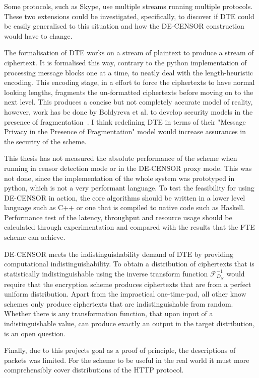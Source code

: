 \documentclass[ %
                    author={Samuel Russell},
                supervisor={Prof. Bogdan Warinschi},
                    degree={MEng},
                     title={Innocuous Ciphertexts},
                  subtitle={The DE-CENSOR Scheme},
                      type={research},
                      year={2018} ]{dissertation}
\begin{document}
Some protocols, such as Skype, use multiple streams running multiple protocols. These two extensions could be investigated, specifically, to discover if DTE could be easily generalised to this situation and how the DE-CENSOR construction would have to change. 

The formalisation of DTE works on a stream of plaintext to produce a stream of ciphertext.
It is formalised this way, contrary to the python implementation of processing message blocks one at a time, to neatly deal with the length-heuristic encoding.
This encoding stage, in a effort to force the ciphertexts to have normal looking lengths, fragments the un-formatted ciphertexts before moving on to the next level.
This produces a concise but not completely accurate model of reality, however, work has be done by Boldyreva et al. to develop security models in the presence of fragmentation~\cite{frag}.
I think redefining DTE in terms of their "Message Privacy in the Presence of Fragmentation" model would increase assurances in the security of the scheme.

This thesis has not measured the absolute performance of the scheme when running in censor detection mode or in the DE-CENSOR proxy mode. This was not done, since the implementation of the whole system was prototyped in python, which is not a very performant language. To test the feasibility for using DE-CENSOR in action, the core algorithms should be written in a lower level language such as C++ or one that is compiled to native code such as Haskell. Performance test of the latency, throughput and resource usage should be calculated through experimentation and compared with the results that the FTE scheme can achieve.

DE-CENSOR meets the indistinguishability demand of DTE by providing computational indistinguishability. To obtain a distribution of ciphertexts that is statistically indistinguishable using the inverse transform function $\mathcal{F}^{-1}_{D_N}$ would require that the encryption scheme produces ciphertexts that are from a perfect uniform distribution. Apart from the impractical one-time-pad, all other know schemes only produce ciphertexts that are indistinguishable from random. Whether there is any transformation function, that upon input of a indistinguishable value, can produce exactly an output in the target distribution, is an open question.

Finally, due to this projects goal as a proof of principle, the descriptions of packets was limited. For the scheme to be useful in the real world it must more comprehensibly cover distributions of the HTTP protocol.
\end{document}
